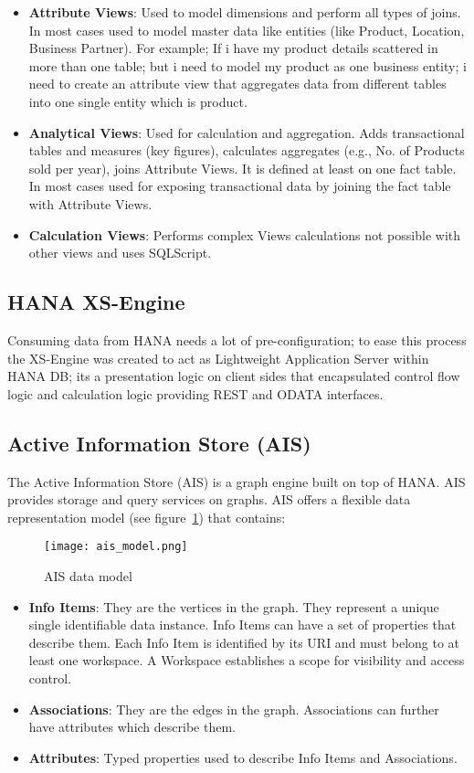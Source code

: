 \begin{itemize}
	\item \textbf{Attribute Views}: Used to model dimensions and perform all types of joins. In most cases used to model master data like entities (like Product, Location, Business Partner). For example; If i have my product details scattered in more than one table; but i need to model my product as one business entity; i need to create an attribute view that aggregates data from different tables into one single entity which is product.
	\item \textbf{Analytical Views}: Used for calculation and aggregation. Adds transactional tables and measures (key figures), calculates aggregates (e.g., No. of Products sold per year), joins Attribute Views. It is defined at least on one fact table. In most cases used for exposing transactional data by joining the fact table with Attribute Views.
	\item \textbf{Calculation Views}: Performs complex Views calculations not possible with other views and uses SQLScript.
\end{itemize}

\subsection{HANA XS-Engine}

Consuming data from HANA needs a lot of pre-configuration; to ease this process the XS-Engine was created to act as Lightweight Application Server within HANA DB; its a presentation logic on client sides that encapsulated control flow logic and calculation logic providing REST and ODATA interfaces.

\subsection{Active Information Store (AIS)} \label{ais}

The Active Information Store (AIS) is a graph engine built on top of HANA. AIS provides storage and query services on graphs. AIS offers a flexible data representation model (see figure~\ref{fig:ais}) that contains:

\begin{figure}[htbp]
\centering
	\texttt{[image: ais\_model.png]}
	\caption{AIS data model}
	\label{fig:ais}
\end{figure}

\begin{itemize}
	\item \textbf{Info Items}: They are the vertices in the graph. They represent a unique single identifiable data instance. Info Items can have a set of properties that describe them. Each Info Item is identified by its URI and must belong to at least one workspace. A Workspace establishes a scope for visibility and access control.
	\item \textbf{Associations}: They are the edges in the graph. Associations can further have attributes which describe them.
	\item \textbf{Attributes}: Typed properties used to describe Info Items and Associations.
\end{itemize}

